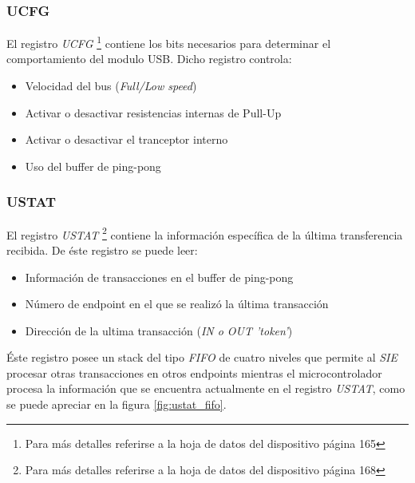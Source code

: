 \subsubsection{UCFG}
El registro \emph{UCFG} \footnote{Para m\'as detalles referirse a la hoja de
datos del dispositivo p\'agina 165} contiene los bits
necesarios para determinar el comportamiento del modulo USB. Dicho registro
controla:

\begin{itemize}
 \item Velocidad del bus (\emph{Full/Low speed})

 \item Activar o desactivar resistencias internas de Pull-Up

 \item Activar o desactivar el tranceptor interno

 \item Uso del buffer de ping-pong
\end{itemize}

\subsubsection{USTAT}
El registro \emph{USTAT} \footnote{Para m\'as detalles referirse a la hoja de
datos del dispositivo p\'agina 168} contiene la
informaci\'on espec\'ifica de la \'ultima transferencia recibida. De \'este
registro se puede leer:

\begin{itemize}
 \item Informaci\'on de transacciones en el buffer de ping-pong

 \item N\'umero de endpoint en el que se realiz\'o la \'ultima transacci\'on

 \item Direcci\'on de la ultima transacci\'on (\emph{IN o OUT 'token'})
\end{itemize}

\'Este registro posee un stack del tipo \emph{FIFO} de cuatro niveles que
permite al \emph{SIE} procesar otras transacciones en otros endpoints mientras
el microcontrolador procesa la informaci\'on que se encuentra actualmente en
el registro \emph{USTAT}, como se puede apreciar en la figura
\ref{fig:ustat_fifo}.

